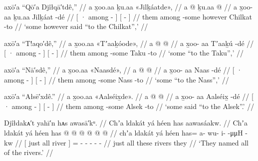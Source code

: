 \ex\label{ex:100-98-chilkat}%
%
\begingl
	\glpreamble	axō′a “Qō′a Djîłqā′tdê,” //
	\glpreamble	a x̱oo.aa ḵu.aa «\!Jilḵáatde\!», //
	\gla	{} a  @ {} {} ḵu.aa 
		{}  @ {} {} //
	\glb	{} a x̱oo- aa {} ḵu.aa
		{} Jilḵáat -dé {} //
	\glc	{}[ · among - {}]  
		{}[  - {}] //
	\gld	{} them among -some {} however 
		{} Chilkat -to {} //
	\glft	‘some however said “to the Chilkat”,’
		//
\endgl
\xe

\ex\label{ex:100-99-taku}%
%
\begingl
	\glpreamble	axō′a “T!aqo′dê,” //
	\glpreamble	a x̱oo.aa «\!Tʼaaḵóode\!», //
	\gla	{} a  @ {} {} 
		{}  @ {} {} //
	\glb	{} a x̱oo- aa {}
		{} Tʼaaḵú -dé {} //
	\glc	{}[ · among - {}]
		{}[  - {}] //
	\gld	{} them among -some {} 
		{} Taku -to {} //
	\glft	‘some “to the Taku”,’
		//
\endgl
\xe

\ex\label{ex:100-100-nass}%
%
\begingl
	\glpreamble	axō′a “Nā′sdê,” //
	\glpreamble	a x̱oo.aa «\!Naasdé\!», //
	\gla	{} a  @ {} {} 
		{}  @ {} {} //
	\glb	{} a x̱oo- aa {}
		{} Naas -dé {} //
	\glc	{}[ · among - {}]
		{}[  - {}] //
	\gld	{} them among -some {} 
		{} Nass -to {} //
	\glft	‘some “to the Nass”,’
		//
\endgl
\xe

\ex\label{ex:100-101-alsek}%
%
\begingl
	\glpreamble	axō′a “Ałsē′xdê.” //
	\glpreamble	a x̱oo.aa «\!Aalséix̱de\!». //
	\gla	{} a  @ {} {} 
		{}  @ {} {} //
	\glb	{} a x̱oo- aa {}
		{} Aalséix̱ -dé {} //
	\glc	{}[ · among - {}]
		{}[  - {}] //
	\gld	{} them among -some {} 
		{} Alsek -to {} //
	\glft	‘some said “to the Alsek”.’
		//
\endgl
\xe

\ex\label{ex:100-102-name-all-rivers}%
%
\begingl
	\glpreamble	Djîłdakᴀ′t yahī′n hᴀs awasā′kᵘ. //
	\glpreamble	Chʼa ldakát yá héen has aawasáakw. //
	\gla	{} Chʼa ldakát yá héen {} 
		has @  @ {} @ {} @ {} @ {} @ {} //
	\glb	{} chʼa ldakát yá héen {}
		has= a- wu- i-  -μμH -kw //
	\glc	{}[ just all  river {}]
		= - - -  - - //
	\gld	{} just all these rivers {}
		they  {} {} {} {} {} //
	\glft	‘They named all of the rivers.’
		//
\endgl
\xe

